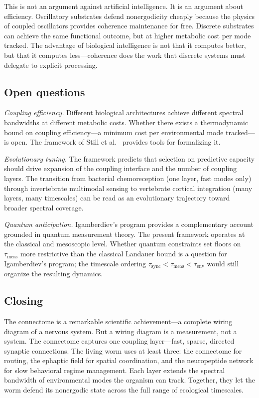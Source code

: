 \documentclass[12pt]{article}
\newcommand{\tsync}{\tau_{\mathrm{sync}}}
\newcommand{\tenv}{\tau_{\mathrm{env}}}
\newcommand{\tmeas}{\tau_{\mathrm{meas}}}
\begin{document}
This is not an argument against artificial intelligence. It is an argument about efficiency. Oscillatory substrates defend nonergodicity cheaply because the physics of coupled oscillators provides coherence maintenance for free. Discrete substrates can achieve the same functional outcome, but at higher metabolic cost per mode tracked. The advantage of biological intelligence is not that it computes better, but that it computes less---coherence does the work that discrete systems must delegate to explicit processing.

\subsection{Open questions}
\label{sec:open}

\textit{Coupling efficiency.} Different biological architectures achieve different spectral bandwidths at different metabolic costs. Whether there exists a thermodynamic bound on coupling efficiency---a minimum cost per environmental mode tracked---is open. The framework of Still et al.\ \cite{still2012} provides tools for formalizing it.

\textit{Evolutionary tuning.} The framework predicts that selection on predictive capacity should drive expansion of the coupling interface and the number of coupling layers. The transition from bacterial chemoreception (one layer, fast modes only) through invertebrate multimodal sensing to vertebrate cortical integration (many layers, many timescales) can be read as an evolutionary trajectory toward broader spectral coverage.

\textit{Quantum anticipation.} Igamberdiev's program \cite{igamberdiev2015,igamberdiev2004} provides a complementary account grounded in quantum measurement theory. The present framework operates at the classical and mesoscopic level. Whether quantum constraints set floors on $\tmeas$ more restrictive than the classical Landauer bound is a question for Igamberdiev's program; the timescale ordering $\tsync < \tmeas < \tenv$ would still organize the resulting dynamics.

\subsection{Closing}
\label{sec:closing}

The connectome is a remarkable scientific achievement---a complete wiring diagram of a nervous system. But a wiring diagram is a measurement, not a system. The connectome captures one coupling layer---fast, sparse, directed synaptic connections. The living worm uses at least three: the connectome for routing, the ephaptic field for spatial coordination, and the neuropeptide network for slow behavioral regime management. Each layer extends the spectral bandwidth of environmental modes the organism can track. Together, they let the worm defend its nonergodic state across the full range of ecological timescales.
\end{document}

